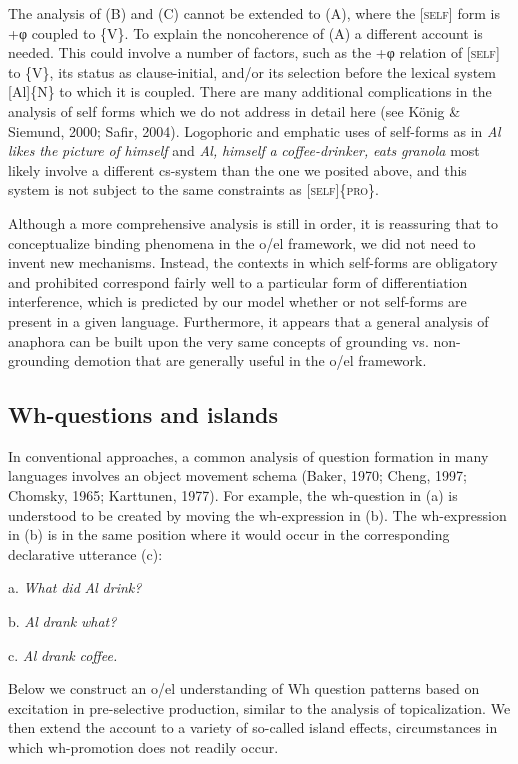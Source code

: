   The analysis of (B) and (C) cannot be extended to (A), where the [\textsc{self}] form is +φ coupled to \{V\}. To explain the noncoherence of (A) a different account is needed. This could involve a number of factors, such as the +φ relation of [\textsc{self}] to \{V\}, its status as clause-initial, and/or its selection before the lexical system [Al]\{N\} to which it is coupled. There are many additional complications in the analysis of self forms which we do not address in detail here (see König \& Siemund, 2000; Safir, 2004). Logophoric and emphatic uses of self-forms as in \textit{Al} \textit{likes} \textit{the} \textit{picture} \textit{of} \textit{himself} and \textit{Al,} \textit{himself} \textit{a} \textit{coffee-drinker,} \textit{eats} \textit{granola} most likely involve a different cs-system than the one we posited above, and this system is not subject to the same constraints as [\textsc{self}]\{\textsc{pro}\}. 

  Although a more comprehensive analysis is still in order, it is reassuring that to conceptualize binding phenomena in the o/el framework, we did not need to invent new mechanisms. Instead, the contexts in which self-forms are obligatory and prohibited correspond fairly well to a particular form of differentiation interference, which is predicted by our model whether or not self-forms are present in a given language. Furthermore, it appears that a general analysis of anaphora can be built upon the very same concepts of grounding vs. non-grounding demotion that are generally useful in the o/el framework.

\subsection{Wh-questions and islands}

In conventional approaches, a common analysis of question formation in many languages involves an object movement schema (Baker, 1970; Cheng, 1997; Chomsky, 1965; Karttunen, 1977). For example, the wh-question in (a) is understood to be created by moving the wh-expression in (b). The wh-expression in (b) is in the same position where it would occur in the corresponding declarative utterance (c):

  a.  \textit{What} \textit{did} \textit{Al} \textit{drink?}

  b.  \textit{Al} \textit{drank} \textit{what?}

  c.  \textit{Al} \textit{drank} \textit{coffee.}

  Below we construct an o/el understanding of Wh question patterns based on excitation in pre-selective production, similar to the analysis of topicalization. We then extend the account to a variety of so-called island effects, circumstances in which wh-promotion does not readily occur. 

